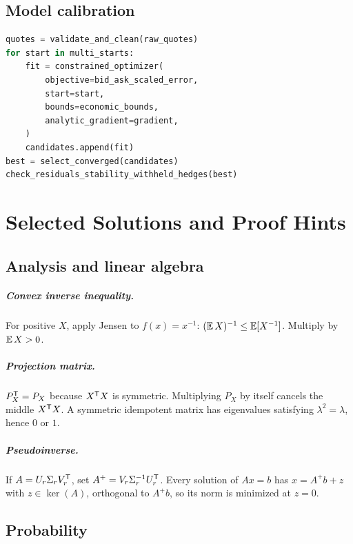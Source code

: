 \section{Model calibration}

\begin{lstlisting}[language=Python]
quotes = validate_and_clean(raw_quotes)
for start in multi_starts:
    fit = constrained_optimizer(
        objective=bid_ask_scaled_error,
        start=start,
        bounds=economic_bounds,
        analytic_gradient=gradient,
    )
    candidates.append(fit)
best = select_converged(candidates)
check_residuals_stability_withheld_hedges(best)
\end{lstlisting}


\chapter{Selected Solutions and Proof Hints}

\section{Analysis and linear algebra}

\paragraph{Convex inverse inequality.}
For positive $X$, apply Jensen to $f(x)=x^{-1}$:
$(\operatorname{\mathbb E} X)^{-1}\leq\operatorname{\mathbb E}[X^{-1}]$. Multiply by $\operatorname{\mathbb E} X>0$.

\paragraph{Projection matrix.}
$P_X^\mathsf T=P_X$ because $X^\mathsf T X$ is symmetric. Multiplying $P_X$ by
itself cancels the middle $X^\mathsf T X$. A symmetric idempotent matrix has
eigenvalues satisfying $\lambda^2=\lambda$, hence $0$ or $1$.

\paragraph{Pseudoinverse.}
If $A=U_r\Sigma_rV_r^\mathsf T$, set
$A^+=V_r\Sigma_r^{-1}U_r^\mathsf T$. Every solution of $Ax=b$ has
$x=A^+b+z$ with $z\in\ker(A)$, orthogonal to $A^+b$, so its norm is minimized at
$z=0$.

\section{Probability}

